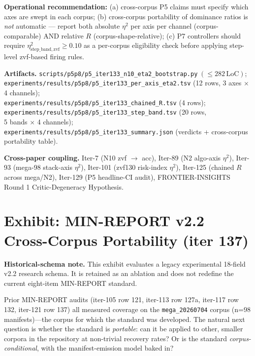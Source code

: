 \documentclass{article}  \usepackage[preprint,nonatbib]{neurips_2026} \usepackage[numbers]{natbib}
\begin{document}
\textbf{Operational recommendation:} (a) cross-corpus P5 claims must
specify which axes are swept in each corpus; (b) cross-corpus portability
of dominance ratios is \emph{not} automatic --- report both absolute
$\eta^2$ per axis per channel (corpus-comparable) AND relative $R$
(corpus-shape-relative); (c) P7 controllers should require
$\eta^2_{\mathrm{step\_band}, \mathrm{zvf}} \geq 0.10$ as a per-corpus
eligibility check before applying step-level zvf-based firing rules.

\noindent\textbf{Artifacts.}\;
\texttt{scripts/p5p8/p5\_iter133\_n10\_eta2\_bootstrap.py}$\;(\leq\!282\,\mathrm{LoC})$;\\
\texttt{experiments/results/p5p8/p5\_iter133\_per\_axis\_eta2.tsv}
(12 rows, 3 axes $\times$ 4 channels);\\
\texttt{experiments/results/p5p8/p5\_iter133\_chained\_R.tsv} (4 rows);\\
\texttt{experiments/results/p5p8/p5\_iter133\_step\_band.tsv} (20 rows,\\
5 bands $\times$ 4 channels);\\
\texttt{experiments/results/p5p8/p5\_iter133\_summary.json}
(verdicts + cross-corpus portability table).

\noindent\textbf{Cross-paper coupling.}\; Iter-7 (N10 zvf $\to$ acc),
Iter-89 (N2 algo-axis $\eta^2$), Iter-93 (mega-98 stack-axis $\eta^2$),
Iter-101 (zvf130 risk-index $\eta^2$), Iter-125 (chained $R$ across
mega/N2), Iter-129 (P5 headline-CI audit), FRONTIER-INSIGHTS
Round 1 Critic-Degeneracy Hypothesis.
 \section{Exhibit: MIN-REPORT v2.2 Cross-Corpus Portability (iter 137)}
\label{sec:p5-iter137-cross-corpus}

\noindent\textbf{Historical-schema note.} This exhibit evaluates a legacy
experimental 18-field v2.2 research schema. It is retained as an ablation and
does not redefine the current eight-item MIN-REPORT standard.

Prior MIN-REPORT audits (iter-105 row 121, iter-113 row 127a, iter-117 row
132, iter-121 row 137) all measured coverage on the
\texttt{mega\_20260704} corpus (n=98 manifests)---the corpus for which
the standard was developed. The natural next question is whether the
standard is \emph{portable}: can it be applied to other, smaller corpora
in the repository at non-trivial recovery rates? Or is the standard
\emph{corpus-conditional}, with the manifest-emission model baked in?
\end{document}
